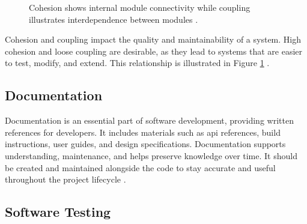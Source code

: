 \begin{figure}[h!]
    \centering

    \caption[Cohesion and coupling]{Cohesion shows internal module connectivity while coupling illustrates interdependence between modules \cite{geeksforgeeks:c&c}.}
    \label{fig:cohesion-coupling}
\end{figure}

Cohesion and coupling impact the quality and maintainability of a system.
High cohesion and loose coupling are desirable, as they lead to systems that are easier to test, modify, and extend. This relationship is illustrated in Figure \ref{fig:cohesion-coupling} 
\cite{geeksforgeeks:c&c}.

\subsection{Documentation}
\label{subsec:documentation}

Documentation is an essential part of software development, providing written references for developers. It includes materials such as \gls{api} references, build instructions, user guides, and design specifications. Documentation supports understanding, maintenance, and helps preserve knowledge over time. It should be created and maintained alongside the code to stay accurate and useful throughout the project lifecycle \cite{geeksforgeeks:doc}.

\subsection{Software Testing}
\label{subsec:testing}

